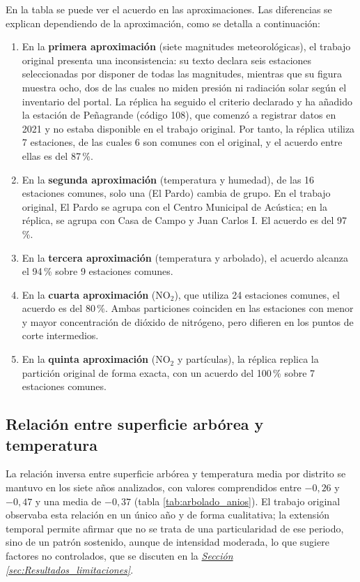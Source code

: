 En la tabla se puede ver el acuerdo en las aproximaciones. Las diferencias se explican dependiendo de la aproximación, como se detalla a continuación:
\begin{enumerate}
	\item En la \textbf{primera aproximación} (siete magnitudes meteorológicas), el trabajo original presenta una inconsistencia: su texto declara seis estaciones seleccionadas por disponer de todas las magnitudes, mientras que su figura muestra ocho, dos de las cuales no miden presión ni radiación solar según el inventario del portal. La réplica ha seguido el criterio declarado y ha añadido la estación de Peñagrande (código 108), que comenzó a registrar datos en 2021 y no estaba disponible en el trabajo original. Por tanto, la réplica utiliza 7 estaciones, de las cuales 6 son comunes con el original, y el acuerdo entre ellas es del 87\,\%.

	\item En la \textbf{segunda aproximación} (temperatura y humedad), de las 16 estaciones comunes, solo una (El Pardo) cambia de grupo. En el trabajo original, El Pardo se agrupa con el Centro Municipal de Acústica; en la réplica, se agrupa con Casa de Campo y Juan Carlos I. El acuerdo es del 97\,\%.

	\item En la \textbf{tercera aproximación} (temperatura y arbolado), el acuerdo alcanza el 94\,\% sobre 9 estaciones comunes.

	\item En la \textbf{cuarta aproximación} (NO$_2$), que utiliza 24 estaciones comunes, el acuerdo es del 80\,\%. Ambas particiones coinciden en las estaciones con menor y mayor concentración de dióxido de nitrógeno, pero difieren en los puntos de corte intermedios.

	\item En la \textbf{quinta aproximación} (NO$_2$ y partículas), la réplica replica la partición original de forma exacta, con un acuerdo del 100\,\% sobre 7 estaciones comunes.
\end{enumerate}

\subsection{Relación entre superficie arbórea y temperatura}
\label{sec:Resultados_arbolado}

La relación inversa entre superficie arbórea y temperatura media por distrito se mantuvo en los siete años analizados, con valores comprendidos entre $-0,26$ y $-0,47$ y una media de $-0,37$ (tabla \ref{tab:arbolado_anios}). El trabajo original observaba esta relación en un único año y de forma cualitativa; la extensión temporal permite afirmar que no se trata de una particularidad de ese periodo, sino de un patrón sostenido, aunque de intensidad moderada, lo que sugiere factores no controlados, que se discuten en la \hyperref[sec:Resultados_limitaciones]{\textit{Sección \ref*{sec:Resultados_limitaciones}}}.

